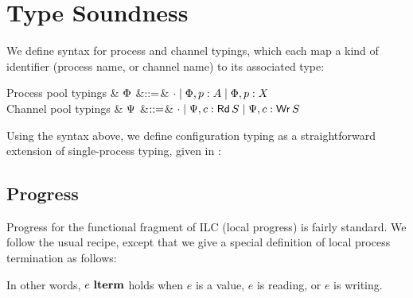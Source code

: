 \section{Type Soundness}
\label{sec:ilcproofs}

We define syntax for process and channel typings, which each map a kind of
identifier (process name, or channel name) to its associated type:

\begin{grammar}
    Process pool typings
    & $\Phi$
    &$\mathrel{::=}$& $\cdot \mathrel{\mid} \Phi,p:A \mathrel{\mid} \Phi,p:X$
    \\
    Channel pool typings
    & $\Psi$
    &$\mathrel{::=}$& $\cdot \mathrel{\mid} \Psi,c:\textnormal{\textsf{Rd}}\,S \mathrel{\mid} \Psi,c:\textnormal{\textsf{Wr}}\,S$
\end{grammar}


Using the syntax above, we define configuration typing as a straightforward extension
of single-process typing, given in :\smallskip


\subsection{Progress}
\label{subsec:label}

Progress for the functional fragment of ILC (local progress) is fairly
standard. We follow the usual recipe, except that we give a special definition
of local process termination as follows:\smallskip

In other words, $e~\textbf{lterm}$ holds when $e$ is a value, $e$ is reading, or $e$ is
writing. 

